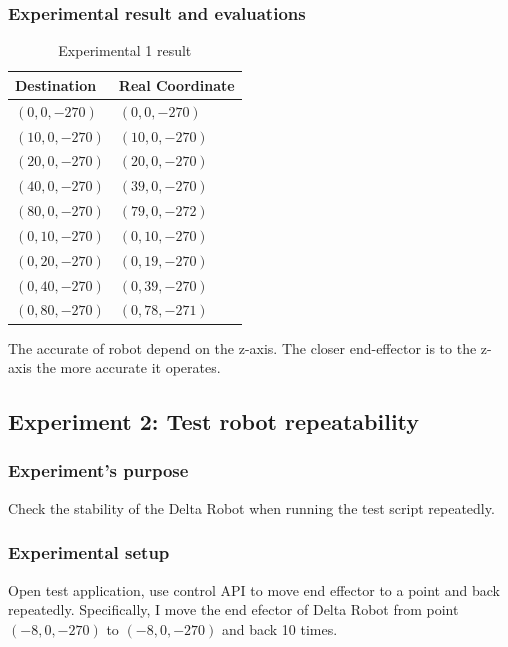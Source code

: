 \subsubsection{Experimental result and evaluations}
\begin{table}[H]
	\centering
	\caption{Experimental 1 result}	
	\label{tab:experiment_1}
	\begin{tabularx}{0.4\textwidth}{l|l}
		\toprule
		\textbf{Destination}	& \textbf{Real Coordinate} \\
		\midrule 
		$(0,0,-270)$			& $(0,0,-270)$ \\
		\midrule 
		$(10,0,-270)$			& $(10,0,-270)$ \\
		\midrule
		$(20,0,-270)$			& $(20,0,-270)$ \\ 
		\midrule
		$(40,0,-270)$			& $(39,0,-270)$ \\ 
		\midrule
		$(80,0,-270)$			& $(79,0,-272)$ \\ 
		\midrule
		$(0,10,-270)$			& $(0,10,-270)$ \\ 
		\midrule
		$(0,20,-270)$			& $(0,19,-270)$ \\ 
		\midrule
		$(0,40,-270)$			& $(0,39,-270)$ \\ 
		\midrule
		$(0,80,-270)$			& $(0,78,-271)$ \\ 
		\bottomrule
	\end{tabularx}
\end{table}

The accurate of robot depend on the z-axis. The closer end-effector is to the z-axis the more accurate it operates.

\subsection{Experiment 2: Test robot repeatability}
\subsubsection{Experiment's purpose}
Check the stability of the Delta Robot when running the test script repeatedly.
\subsubsection{Experimental setup}
Open test application, use control API to move end effector to a point and back repeatedly. Specifically, I move the end efector of Delta Robot from point $(-8, 0, -270)$ to $(-8, 0, -270)$ and back 10 times.

